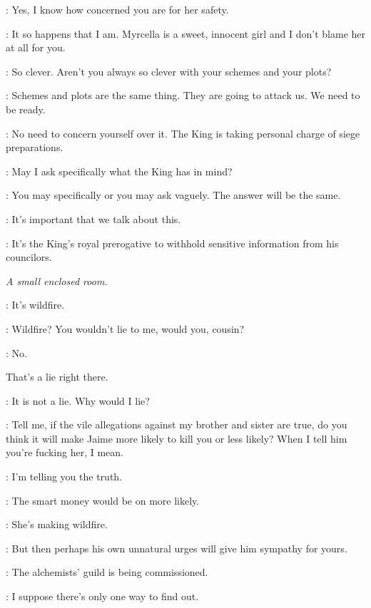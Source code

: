 \CERSEI: Yes, I know how concerned you are for her safety. 

\TYRION: It so happens that I am. Myrcella is a sweet, innocent girl and I don't blame her at all for you. 

\CERSEI: So clever. Aren't you always so clever with your schemes and your plots? 

\TYRION: Schemes and plots are the same thing. They are going to attack us. We need to be ready. 

\CERSEI: No need to concern yourself over it. The King is taking personal charge of siege preparations. 

\TYRION: May I ask specifically what the King has in mind? 

\CERSEI: You may specifically or you may ask vaguely. The answer will be the same. 

\TYRION: It's important that we talk about this. 

\CERSEI: It's the King's royal prerogative to withhold sensitive information from his councilors. 



\scene

\textit{A small enclosed room.} 


\LANCEL: It's wildfire. 

\TYRION: Wildfire? You wouldn't lie to me, would you, cousin? 

\LANCEL: No. 

That's a lie right there. 

\LANCEL: It is not a lie. Why would I lie? 

\TYRION: Tell me, if the vile allegations against my brother and sister are true, do you think it will make Jaime more likely to kill you or less likely? When I tell him you're fucking her, I mean. 

\LANCEL: I'm telling you the truth. 

\TYRION: The smart money would be on more likely. 

\LANCEL: She's making wildfire. 

\TYRION: But then perhaps his own unnatural urges will give him sympathy for yours. 

\LANCEL: The alchemists' guild is being commissioned. 

\TYRION: I suppose there's only one way to find out. 

